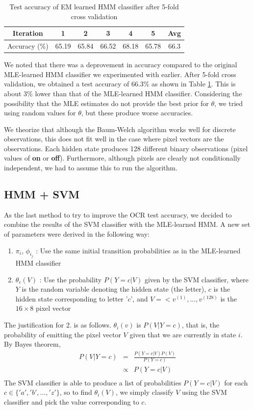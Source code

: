 \documentclass{article} %
\begin{document}
\begin{table}[h]
\centering
\begin{tabular}{|c|c|c|c|c|c|c|}
\hline
Iteration & 1 & 2 & 3 & 4 & 5 & Avg \\
\hline 
Accuracy (\%) & 65.19 & 65.84 & 66.52 & 68.18 & 65.78 & 66.3 \\
\hline 
\end{tabular}
\caption{Test accuracy of EM learned HMM classifier after 5-fold cross validation}
\label{tab:bw-cross-val}
\end{table}

We noted that there was a deprovement in accuracy compared to the original MLE-learned HMM classifier we experimented with earlier. After 5-fold cross validation, we obtained a test accuracy of 66.3\% as shown in Table \ref{tab:bw-cross-val}. This is about 3\% lower than that of the MLE-learned HMM classifier. Considering the possibility that the MLE estimates do not provide the best prior for $\theta$, we tried using random values for $\theta$, but these produce worse accuracies.

We theorize that although the Baum-Welch algorithm works well for discrete observations, this does not fit well in the case where pixel vectors are the observations. Each hidden state produces 128 different binary observations (pixel values of \textbf{on} or \textbf{off}). Furthermore, although pixels are clearly not conditionally independent, we had to assume this to run the algorithm.

\subsection{HMM + SVM}

As the last method to try to improve the OCR test accuracy, we decided to combine the results of the SVM classifier with the MLE-learned HMM. A new set of parameters were derived in the following way:
\begin{enumerate}
	\item $\pi_i$, $\phi_{i_j}$ : Use the same initial transition probabilities as in the MLE-learned HMM classifier
	\item $\theta_c(V)$ : Use the probability $P(Y=c|V)$ given by the SVM classifier, where $Y$ is the random variable denoting the hidden state (the letter), $c$ is the hidden state corresponding to letter '$c$', and $V = <v^{(1)}, ..., v^{(128)}$ is the $16 \times 8$ pixel vector
\end{enumerate}
The justification for 2. is as follows. $\theta_i(v)$ is $P(V|Y=c)$, that is, the probability of emitting the pixel vector $V$ given that we are currently in state $i$. By Bayes theorem, 
\begin{eqnarray*}
	P(V|Y=c) &=& \frac{P(Y=c|V)P(V)}{P(Y=c)} \\
	&\propto & P(Y=c|V) \\
\end{eqnarray*}
The SVM classifier is able to produce a list of probabilities $P(Y = c | V)$ for each  $c \in \{'a', 'b', ..., 'z'\}$, so to find $\theta_i(V)$, we simply classify $V$ using the SVM classifier and pick the value corresponding to $c$.
\end{document}
